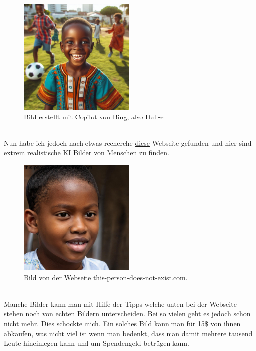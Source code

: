 \begin{figure}[h]
    \centering
    \includegraphics[width=0.5\textwidth]{copilot(dall-e).jpeg}
    \caption{Bild erstellt mit Copilot von Bing, also Dall-e}
    \label{fig:copilot(dall-e)}
\end{figure}
\\Nun habe ich jedoch nach etwas recherche \href{https://this-person-does-not-exist.com}{diese} Webseite gefunden und hier sind extrem realistische KI Bilder von Menschen zu finden.
\begin{figure}[h]
    \centering
    \includegraphics[width=0.5\textwidth]{this_person_does_not_exist.jpeg}
    \caption{Bild von der Webseite \href{https://this-person-does-not-exist.com}{this-person-does-not-exist.com}.}
    \label{fig:this_person_does_not_exist}
\end{figure}
\\Manche Bilder kann man mit Hilfe der Tipps welche unten bei der Webseite stehen noch von echten Bildern unterscheiden. Bei so vielen geht es jedoch schon nicht mehr. Dies schockte mich. Ein solches Bild kann man für 15\$ von ihnen abkaufen, was nicht viel ist wenn man bedenkt, dass man damit mehrere tausend Leute hineinlegen kann und um Spendengeld betrügen kann.
\\

